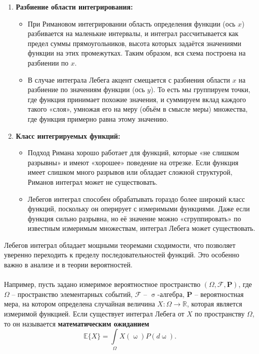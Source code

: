\documentclass[a4paper, 12pt]{report}
\numberwithin{equation}{section}
\renewcommand{\sigma}{\upsigma}
\renewcommand{\omega}{\upomega}
\begin{document}
	\begin{enumerate}
		\item \textbf{Разбиение области интегрирования:}
		\begin{itemize}
			\item При Римановом интегрировании область определения функции (ось $x$) разбивается на маленькие интервалы, и интеграл рассчитывается как предел суммы прямоугольников, высота которых задаётся значениями функции на этих промежутках. Таким образом, вся схема построена на разбиении по $x$.
			\item В случае интеграла Лебега акцент смещается с разбиения области $x$ на разбиение по значениям функции (ось $y$). То есть мы группируем точки, где функция принимает похожие значения, и суммируем вклад каждого такого «слоя», умножая его на меру (объём в смысле меры) множества, где функция примерно равна этому значению.
		\end{itemize}
		\item \textbf{Класс интегрируемых функций:}
		\begin{itemize}
			\item Подход Римана хорошо работает для функций, которые «не слишком разрывны» и имеют «хорошее» поведение на отрезке. Если функция имеет слишком много разрывов или обладает сложной структурой, Риманов интеграл может не существовать.
			\item Лебегов интеграл способен обрабатывать гораздо более широкий класс функций, поскольку он оперирует с измеримыми функциями. Даже если функция сильно разрывна, но её значение можно «сгруппировать» по известным измеримым множествам, интеграл Лебега может существовать.
		\end{itemize}
	\end{enumerate}
	Лебегов интеграл обладает мощными теоремами сходимости, что позволяет уверенно переходить к пределу последовательностей функций. Это особенно важно в анализе и в теории вероятностей.
	\\\\
	Например, пусть задано измеримое вероятностное пространство $(\Omega, \mathcal F, \mathbf P)$, где $\Omega$ -- пространство элементарных событий, $\mathcal F$ -- $\sigma$-алгебра, $\mathbf P$ -- вероятностная мера, на котором определена случайная величина $X : \Omega \to \mathbb R$, которая является измеримой функцией. Если существует интеграл Лебега от $X$ по пространству $\Omega$, то он называется \textbf{математическим ожиданием}
	\begin{equation}
		\mathbb E \{X\} = \int\limits_\Omega X(\omega) P(d\omega).
	\end{equation}
\end{document}
